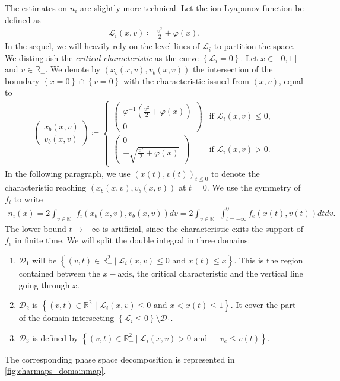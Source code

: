 \documentclass{article}
\numberwithin{equation}{section}
\newcommand{\vv}[1]{\begin{pmatrix} #1 \end{pmatrix}} %
\newcommand{\ve}{{\overline{v}_e}} %
\newcommand{\DomUpL}{{\mathcal{D}_1}} %
\newcommand{\DomUpR}{{\mathcal{D}_2}} %
\newcommand{\DomLow}{{\mathcal{D}_3}} %
\begin{document}
The estimates on $n_i$ are slightly more technical. Let the ion Lyapunov function be defined as
\begin{align}\label{eq:def_Li}
	\mathcal{L}_i(x,v) \coloneqq \frac{v^2}{2} + \varphi(x).
\end{align}
In the sequel, we will heavily rely on the level lines of $\mathcal{L}_i$ to partition the space. We distinguish the \emph{critical characteristic} as the curve $\left\{\mathcal{L}_i = 0\right\}$.
Let $x\in[0,1]$ and $v \in \mathbb{R}_{-}$. We denote by $(x_b(x,v),v_b(x,v))$ the intersection of the boundary $\left\{x=0\right\}\cap\left\{v=0\right\}$ with the characteristic issued from $(x,v)$, equal to
\begin{align*}
	\vv{x_b(x,v) \\ v_b(x,v)} \coloneqq 
	\begin{cases}
		\vv{\varphi^{-1}\left(\frac{v^2}{2} + \varphi(x)\right) \\ 0} & \text{if } \mathcal{L}_i(x,v) \leqslant 0, \\
		\vv{0 \\ - \sqrt{\frac{v^2}{2} + \varphi(x)}} & \text{if } \mathcal{L}_i(x,v) > 0.
	\end{cases}
\end{align*}
In the following paragraph, we use $(x(t),v(t))_{t\leqslant0}$ to denote the characteristic reaching $(x_b(x,v),v_b(x,v))$ at $t=0$. 
We use the symmetry of $f_i$ to write 
\begin{align*}
	n_i(x) = 2 \int_{v\in\mathbb{R}^{-}} f_i(x_b(x,v), v_b(x,v)) dv = 2 \int_{v\in\mathbb{R}^{-}}\int_{t=-\infty}^{0} f_e(x(t),v(t)) dt dv.
\end{align*}
The lower bound $t \to -\infty$ is artificial, since the characteristic exits the support of $f_e$ in finite time. We will split the double integral in three domains:
\begin{enumerate}
\item $\DomUpL$ will be $\left\{(v,t) \in \mathbb{R}_{-}^2 \ |\ \mathcal{L}_i(x,v) \leqslant 0 \text{ and } x(t) \leqslant x \right\}$. This is the region contained between the $x-$axis, the critical characteristic and the vertical line going through $x$.
\item $\DomUpR$ is $\left\{(v,t) \in \mathbb{R}_{-}^2 \ |\ \mathcal{L}_i(x,v) \leqslant 0 \text{ and } x < x(t) \leqslant 1 \right\}$. It cover the part of the domain intersecting $\left\{\mathcal{L}_i \leqslant 0\right\} \setminus \DomUpL$.
\item $\DomLow$ is defined by $\left\{(v,t) \in \mathbb{R}_{-}^2 \ |\ \mathcal{L}_i(x,v) > 0 \text{ and } -\ve \leqslant v(t) \right\}$. 
\end{enumerate}
The corresponding phase space decomposition is represented in \cref{fig:charmaps_domainmap}.
\end{document}
